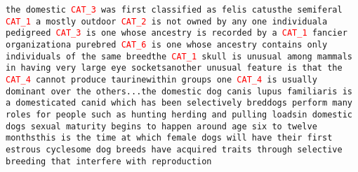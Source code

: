 \texttt{the domestic \textcolor{red}{CAT\_3} was first classified as felis catus\newline the semiferal \textcolor{red}{CAT\_1} a mostly outdoor \textcolor{red}{CAT\_2} is not owned by any one individual\newline a pedigreed \textcolor{red}{CAT\_3} is one whose ancestry is recorded by a \textcolor{red}{CAT\_1} fancier organization\newline a purebred \textcolor{red}{CAT\_6} is one whose ancestry contains only individuals of the same breed\newline the \textcolor{red}{CAT\_1} skull is unusual among mammals in having very large eye sockets\newline another unusual feature is that the \textcolor{red}{CAT\_4} cannot produce taurine\newline within groups one \textcolor{red}{CAT\_4} is usually dominant over the others\newline ...\newline the domestic dog canis lupus familiaris is a domesticated canid which has been selectively bred\newline dogs perform many roles for people such as hunting herding and pulling loads\newline in domestic dogs sexual maturity begins to happen around age six to twelve months\newline this is the time at which female dogs will have their first estrous cycle\newline some dog breeds have acquired traits through selective breeding that interfere with reproduction}